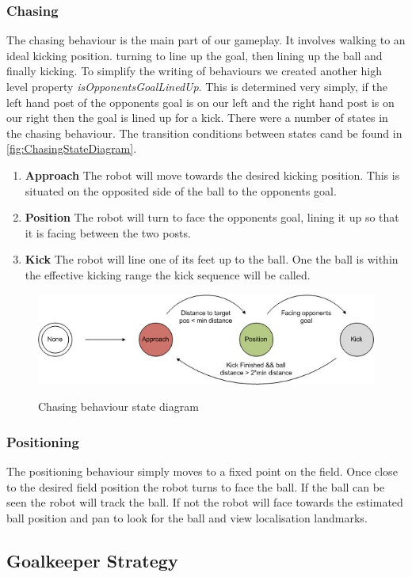 \subsubsection{Chasing}
The chasing behaviour is the main part of our gameplay. It involves walking to an ideal kicking position. turning to line up the goal, then lining up the ball and finally kicking. To simplify the writing of behaviours we created another high level property \emph{isOpponentsGoalLinedUp}. This is determined very simply, if the left hand post of the opponents goal is on our left and the right hand post is on our right then the goal is lined up for a kick. There were a number of states in the chasing behaviour. The transition conditions between states cand be found in \autoref{fig:ChasingStateDiagram}.
\begin{enumerate}
\item \textbf{Approach} The robot will move towards the desired kicking position. This is situated on the opposited side of the ball to the opponents goal.
\item \textbf{Position} The robot will turn to face the opponents goal, lining it up so that it is facing between the two posts.
\item \textbf{Kick} The robot will line one of its feet up to the ball. One the ball is within the effective kicking range the kick sequence will be called.
\end{enumerate}

\begin{figure}[htpb]
\begin{center}
   \leavevmode
    \scalebox{0.8} {\includegraphics{figs/FieldPlayerChasingStates.jpg} }
    \caption{Chasing behaviour state diagram}
    \label{fig:ChasingStateDiagram}
\end{center}
\end{figure}

\subsubsection{Positioning}
The positioning behaviour simply moves to a fixed point on the field. Once close to the desired field position the robot turns to face the ball. If the ball can be seen the robot will track the ball. If not the robot will face towards the estimated ball position and pan to look for the ball and view localisation landmarks.

\subsection{Goalkeeper Strategy}

